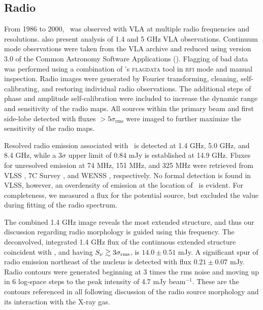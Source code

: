 \documentclass[useAMS,usenatbib]{mn2e}
\begin{document}
\subsection{Radio}
\label{sec:vla}

From 1986 to 2000, \irs\ was observed with VLA at multiple radio
frequencies and resolutions. \citet[][hereafter
  H93]{1993ApJ...415...82H} also present analysis of 1.4 and 5 GHz VLA
observations. Continuum mode observations were taken from the VLA
archive and reduced using version 3.0 of the Common Astronomy Software
Applications (\casa). Flagging of bad data was performed using a
combination of \casa's {\textsc{flagdata}} tool in {\textsc{rfi}} mode
and manual inspection. Radio images were generated by Fourier
transforming, cleaning, self-calibrating, and restoring individual
radio observations. The additional steps of phase and amplitude
self-calibration were included to increase the dynamic range and
sensitivity of the radio maps. All sources within the primary beam and
first side-lobe detected with fluxes $> 5\sigma_{\mathrm{rms}}$ were
imaged to further maximize the sensitivity of the radio maps.

Resolved radio emission associated with \irs\ is detected at 1.4 GHz,
5.0 GHz, and 8.4 GHz, while a $3\sigma$ upper limit of $0.84$ mJy is
established at 14.9 GHz. Fluxes for unresolved emission at 74 MHz, 151
MHz, and 325 MHz were retrieved from VLSS \citep{vlss}, 7C Survey
\citep{1999MNRAS.306...31R}, and WENSS \citep{1997A&AS..124..259R},
respectively. No formal detection is found in VLSS, however, an
overdensity of emission at the location of \irs\ is evident. For
completeness, we measured a flux for the potential source, but
excluded the value during fitting of the radio spectrum.

The combined 1.4 GHz image reveals the most extended structure, and
thus our discussion regarding radio morphology is guided using this
frequency. The deconvolved, integrated 1.4 GHz flux of the continuous
extended structure coincident with \irs, and having $S_{\nu} \gtrsim
3\sigma_{\mathrm{rms}}$, is $14.0 \pm 0.51$ mJy. A significant spur of
radio emission northeast of the nucleus is detected with flux $0.21
\pm 0.07$ mJy. Radio contours were generated beginning at 3 times the
rms noise and moving up in 6 log-space steps to the peak intensity of
4.7 mJy beam$^{-1}$. These are the contours referenced in all
following discussion of the radio source morphology and its
interaction with the X-ray gas.
\end{document}
